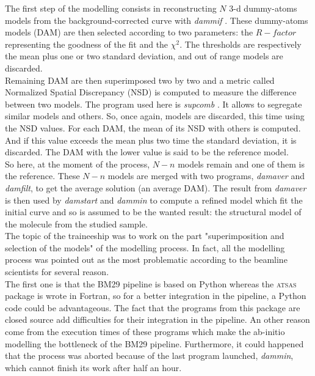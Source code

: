 \documentclass[a4paper, 11pt]{report}
\begin{document}
The first step of the modelling consists in reconstructing $N$ 3-d 
dummy-atoms models from the background-corrected curve with 
\textit{dammif} \cite{dammif}. %
These dummy-atoms models (DAM) are then selected according to two 
parameters: the $R-factor$ representing the goodness of the fit and 
the $\chi^2$. %
The thresholds are respectively the mean plus one or two standard 
deviation, and out of range models are discarded.\\
Remaining DAM are then superimposed two by two and a metric called 
Normalized Spatial Discrepancy (NSD) is computed to measure the 
difference between two models. 
The program used here is \textit{supcomb} \cite{supcomb}. 
It allows to segregate similar models and others. 
So, once again, models are discarded, this time using the NSD values. 
For each DAM, the mean of its NSD with others is computed. 
And if this value exceeds the mean plus two time the standard 
deviation, it is discarded. 
The DAM with the lower value is said to be the reference model.\\
So here, at the moment of the process, $N - n$ models remain and one 
of them is the reference. 
These $N - n$ models are merged with two programs, \textit{damaver} 
\cite{damaver} and \textit{damfilt}, to get the average solution (an 
average DAM). 
The result from \textit{damaver} is then used by \textit{damstart} and 
\textit{dammin} \cite{dammin} to compute a refined model which fit the 
initial curve and so is assumed to be the wanted result: the 
structural model of the molecule from the studied sample.\\

The topic of the traineeship was to work on the part "superimposition 
and selection of the models" of the modelling process. 
In fact, all the modelling process was pointed out as the most 
problematic according to the beamline scientists for several reason.\\
The first one is that the BM29 pipeline is based on Python whereas the 
\textsc{atsas} package is wrote in Fortran, so for a better 
integration in the pipeline, a Python code could be advantageous. 
The fact that the programs from this package are closed source add 
difficulties for their integration in the pipeline. 
An other reason come from the execution times of these programs which 
make the ab-initio modelling the bottleneck of the BM29 pipeline. 
Furthermore, it could happened that the process was aborted because of 
the last program launched, \textit{dammin}, which cannot finish its 
work after half an hour.\\
\end{document}
